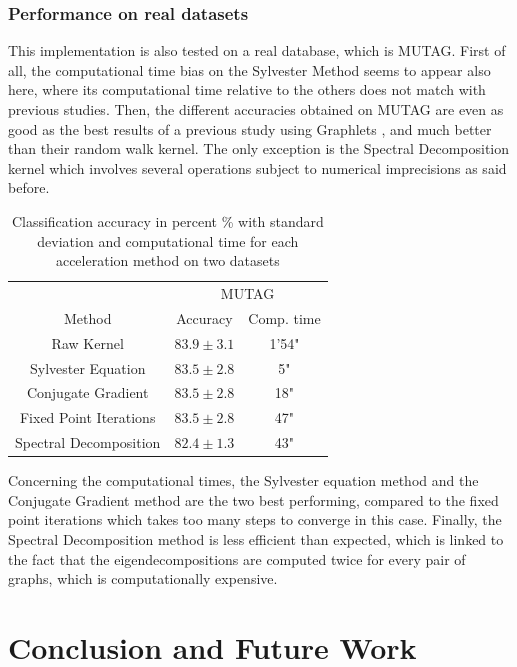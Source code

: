 \documentclass{article}
\theoremstyle{definition}
\begin{document}
\subsubsection{Performance on real datasets}
This implementation is also tested on a real database, which is MUTAG. First of all, the computational time bias on the Sylvester Method seems to appear also here, where its computational time relative to the others does not match with previous studies\cite{vishwanathan_graph_2010,shervashidze_efficient_2009}. Then, the different accuracies obtained  on MUTAG are even as good as the best results of a previous study using Graphlets \cite{shervashidze_efficient_2009}, and much better than their random walk kernel. The only exception is the Spectral Decomposition kernel which involves several operations subject to numerical imprecisions as said before.
\begin{table}[!htb]
	\begin{center}
		\begin{tabular}{|c||c|c|}
			\hline
			& \multicolumn{2}{|c|}{MUTAG}\\
			\cline{2-3}
			Method & Accuracy & Comp. time\\
			\hline 
			Raw Kernel & $83.9\pm 3.1$ & 1'54"\\
			Sylvester Equation & $83.5\pm 2.8$ & 5"\\
			Conjugate Gradient & $83.5\pm 2.8$ & 18"\\
			Fixed Point Iterations & $83.5\pm 2.8$ & 47" \\
			Spectral Decomposition & $82.4\pm 1.3$ & 43"\\
			\hline
		\end{tabular}
	\end{center}
\caption{Classification accuracy in percent \% with standard deviation and computational time for each acceleration method on two datasets}
\end{table}
Concerning the computational times, the Sylvester equation method and the Conjugate Gradient method are the two best performing, compared to the fixed point iterations which takes too many steps to converge in this case. Finally, the Spectral Decomposition method is less efficient than expected, which is linked to the fact that the eigendecompositions are computed twice for every pair of graphs, which is computationally expensive. 

\section{Conclusion and Future Work}
\end{document}
